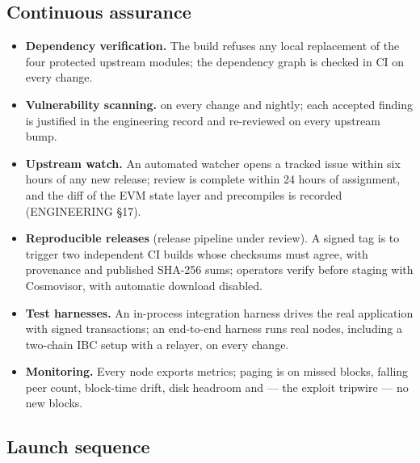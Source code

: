 \subsection{Continuous assurance}

\begin{itemize}
\item \textbf{Dependency verification.} The build refuses any local replacement
  of the four protected upstream modules; the dependency graph is checked in
  CI on every change.
\item \textbf{Vulnerability scanning.}  on every change and
  nightly; each accepted finding is justified in the engineering record and
  re-reviewed on every upstream bump.
\item \textbf{Upstream watch.} An automated watcher opens a tracked issue within
  six hours of any new  release; review is complete within 24
  hours of assignment, and the diff of the EVM state layer and precompiles is
  recorded (ENGINEERING \S17).
\item \textbf{Reproducible releases} (release pipeline under review). A signed
  tag is to trigger two independent CI builds whose checksums must agree, with
  provenance and published SHA-256 sums; operators verify before staging with
  Cosmovisor, with automatic download disabled.
\item \textbf{Test harnesses.} An in-process integration harness drives the real
  application with signed transactions; an end-to-end harness runs real nodes,
  including a two-chain IBC setup with a relayer, on every change.
\item \textbf{Monitoring.} Every node exports metrics; paging is on missed
  blocks, falling peer count, block-time drift, disk headroom and --- the
  exploit tripwire --- no new blocks.
\end{itemize}

\subsection{Launch sequence}
\label{sec:launch}

